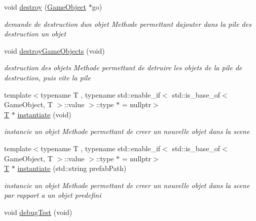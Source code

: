 \begin{DoxyCompactItemize}
void \mbox{\hyperlink{class_beer_engine_1_1_a_scene_af40b9c9c30c3c55991792d45867c022b}{destroy}} (\mbox{\hyperlink{class_beer_engine_1_1_game_object}{Game\+Object}} $\ast$go)
\begin{DoxyCompactList}\small\item\em demande de destruction d\textquotesingle{}un objet Methode permettant d\textquotesingle{}ajouter dans la pile des destruction un objet \end{DoxyCompactList}\item 
void \mbox{\hyperlink{class_beer_engine_1_1_a_scene_a3f8b7e31b089fd39ed8c6d1505a91c16}{destroy\+Game\+Objects}} (void)
\begin{DoxyCompactList}\small\item\em destruction des objets Methode permettant de detruire les objets de la pile de destruction, puis vite la pile \end{DoxyCompactList}\item 
{\footnotesize template$<$typename T , typename std\+::enable\+\_\+if$<$ std\+::is\+\_\+base\+\_\+of$<$ Game\+Object, T $>$\+::value $>$\+::type $\ast$  = nullptr$>$ }\\\mbox{\hyperlink{namespace_beer_engine_a94f0b552f6dc910de8cdb44207981f53a8de48e594408f9fc561b2f68ce05f664}{T}} $\ast$ \mbox{\hyperlink{class_beer_engine_1_1_a_scene_a2bd087ae22796d1e286c867f4f1ecc38}{instantiate}} (void)
\begin{DoxyCompactList}\small\item\em instancie un objet Methode permettant de creer un nouvelle objet dans la scene \end{DoxyCompactList}\item 
{\footnotesize template$<$typename T , typename std\+::enable\+\_\+if$<$ std\+::is\+\_\+base\+\_\+of$<$ Game\+Object, T $>$\+::value $>$\+::type $\ast$  = nullptr$>$ }\\\mbox{\hyperlink{namespace_beer_engine_a94f0b552f6dc910de8cdb44207981f53a8de48e594408f9fc561b2f68ce05f664}{T}} $\ast$ \mbox{\hyperlink{class_beer_engine_1_1_a_scene_acf89d3198589c3e3007b0bc0579dd9ab}{instantiate}} (std\+::string prefab\+Path)
\begin{DoxyCompactList}\small\item\em instancie un objet Methode permettant de creer un nouvelle objet dans la scene par rapport a un objet predefini \end{DoxyCompactList}\item 
void \mbox{\hyperlink{class_beer_engine_1_1_a_scene_a44f55dbd991eb07e425ca163f4773766}{debug\+Test}} (void)

\end{DoxyCompactItemize}
